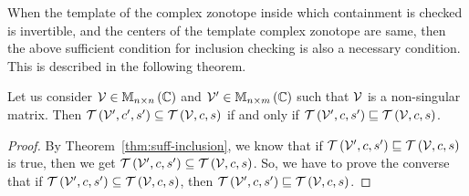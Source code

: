 When the template of the complex zonotope inside which containment is
checked is invertible, and the centers of the template complex
zonotope are same, then the above sufficient condition for inclusion
checking is also a necessary condition.  This is described in the
following theorem.
%
\begin{theorem}
Let us consider
$\mathcal{V}\in\mathbb{M}_{n\times n}\left(\mathbb{C}\right)$ and
$\mathcal{V}^\prime\in\mathbb{M}_{n\times m}\left(\mathbb{C}\right)$ such that $\mathcal{V}$ is a non-singular matrix.
Then
$\mathit{\operatorname{\mathcal{T}}}\left(\mathcal{V}^\prime,c^\prime,s^\prime\right)\subseteq\mathit{\operatorname{\mathcal{T}}}\left(\mathcal{V},c,s\right)$
if and only if
$\mathit{\operatorname{\mathcal{T}}}\left(\mathcal{V}^\prime,c,s^\prime\right)\sqsubseteq\mathit{\operatorname{\mathcal{T}}}\left(\mathcal{V},c,s\right)$.
\end{theorem}
%
\begin{proof}
By Theorem~\ref{thm:suff-inclusion}, we know that if
$\mathit{\operatorname{\mathcal{T}}}\left(\mathcal{V}^\prime,c,s^\prime\right)\sqsubseteq\mathit{\operatorname{\mathcal{T}}}\left(\mathcal{V},c,s\right)$
is true,
then we get
$\mathit{\operatorname{\mathcal{T}}}\left(\mathcal{V}^\prime,c,s^\prime\right)\subseteq\mathit{\operatorname{\mathcal{T}}}\left(\mathcal{V},c,s\right)$.
So, we have to prove the converse that if
$\mathit{\operatorname{\mathcal{T}}}\left(\mathcal{V}^\prime,c,s^\prime\right)\subseteq\mathit{\operatorname{\mathcal{T}}}\left(\mathcal{V},c,s\right)$,
then
$\mathit{\operatorname{\mathcal{T}}}\left(\mathcal{V}^\prime,c,s^\prime\right)\sqsubseteq\mathit{\operatorname{\mathcal{T}}}\left(\mathcal{V},c,s\right)$.


\end{proof}
